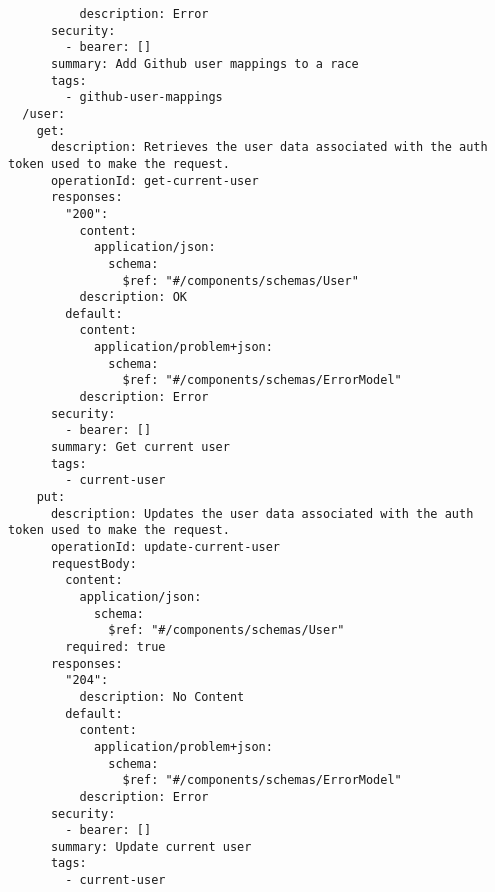 \begin{verbatim}
          description: Error
      security:
        - bearer: []
      summary: Add Github user mappings to a race
      tags:
        - github-user-mappings
  /user:
    get:
      description: Retrieves the user data associated with the auth token used to make the request.
      operationId: get-current-user
      responses:
        "200":
          content:
            application/json:
              schema:
                $ref: "#/components/schemas/User"
          description: OK
        default:
          content:
            application/problem+json:
              schema:
                $ref: "#/components/schemas/ErrorModel"
          description: Error
      security:
        - bearer: []
      summary: Get current user
      tags:
        - current-user
    put:
      description: Updates the user data associated with the auth token used to make the request.
      operationId: update-current-user
      requestBody:
        content:
          application/json:
            schema:
              $ref: "#/components/schemas/User"
        required: true
      responses:
        "204":
          description: No Content
        default:
          content:
            application/problem+json:
              schema:
                $ref: "#/components/schemas/ErrorModel"
          description: Error
      security:
        - bearer: []
      summary: Update current user
      tags:
        - current-user
\end{verbatim}